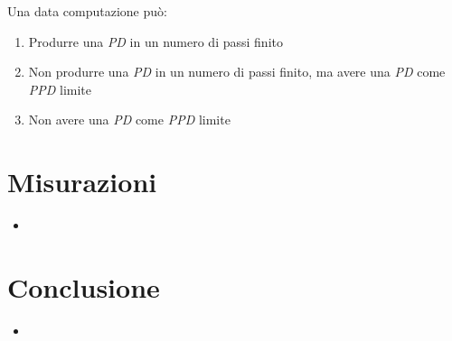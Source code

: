 \documentclass{beamer}
\begin{document}
\begin{frame}{\subsecname}{}
	Una data computazione può:
	\begin{enumerate}
		\item Produrre una \textit{PD} in un numero di passi finito
		\item Non produrre una \textit{PD} in un numero di passi finito, ma avere una \textit{PD} come \textit{PPD} limite
		\item Non avere una \textit{PD} come \textit{PPD} limite
	\end{enumerate}
\end{frame}

\section{Misurazioni}

\begin{frame}{\secname}{}
	\begin{itemize}
		\item
	\end{itemize}
\end{frame}

\section{Conclusione}

\begin{frame}{\secname}{}
	\begin{itemize}
		\item
	\end{itemize}
\end{frame}
\end{document}
